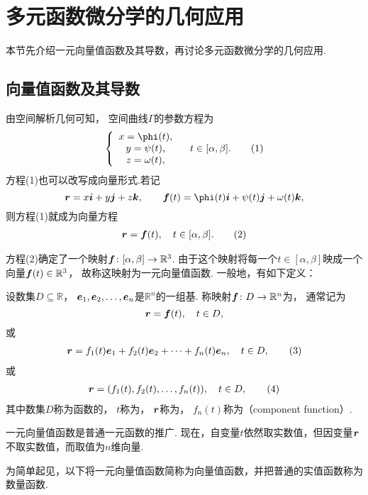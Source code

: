\section{多元函数微分学的几何应用}
本节先介绍一元向量值函数及其导数，再讨论多元函数微分学的几何应用.

\subsection{向量值函数及其导数}
由空间解析几何可知，
空间曲线\(\Gamma\)的参数方程为\begin{gather}
	\left\{ \begin{array}{c}
		x=\phi(t), \\
		y=\psi(t), \\
		z=\omega(t),
	\end{array} \right. \quad
	t \in [\alpha,\beta].
	\tag1
\end{gather}
方程(1)也可以改写成向量形式.若记\[
	\vb{r}=x\vb{i}+y\vb{j}+z\vb{k},
	\qquad
	\vb{f}(t)=\phi(t)\vb{i}+\psi(t)\vb{j}+\omega(t)\vb{k},
\]
则方程(1)就成为向量方程\begin{gather}
	\vb{r}=\vb{f}(t), \quad t \in [\alpha,\beta].
	\tag2
\end{gather}

方程(2)确定了一个映射\(\boldsymbol{f}\colon [\alpha,\beta]\to\mathbb{R}^3\).
由于这个映射将每一个\(t\in[\alpha,\beta]\)映成一个向量\(\boldsymbol{f}(t)\in\mathbb{R}^3\)，
故称这映射为一元向量值函数.
一般地，有如下定义：
\begin{definition}
设数集\(D \subseteq \mathbb{R}\)，
\(\boldsymbol{e}_1,\boldsymbol{e}_2,\dotsc,\boldsymbol{e}_n\)是\(\mathbb{R}^n\)的一组基.
称映射\(\boldsymbol{f}\colon D\to\mathbb{R}^n\)为，
通常记为\[
	\boldsymbol{r}=\boldsymbol{f}(t), \quad t \in D,
\]
或\begin{gather}
	\vb{r}=f_1(t)\vb{e}_1+f_2(t)\vb{e}_2+\dotsb+f_n(t)\vb{e}_n, \quad t \in D,
	\tag3
\end{gather}
或\begin{gather}
	\vb{r}=(f_1(t),f_2(t),\dotsc,f_n(t)), \quad t \in D,
	\tag4
\end{gather}
其中数集\(D\)称为函数的，
\(t\)称为，
\(\boldsymbol{r}\)称为，
\(f_n(t)\)称为（component function）.
\end{definition}
一元向量值函数是普通一元函数的推广.
现在，自变量\(t\)依然取实数值，但因变量\(\boldsymbol{r}\)不取实数值，而取值为\(n\)维向量.

为简单起见，以下将一元向量值函数简称为向量值函数，并把普通的实值函数称为数量函数.

